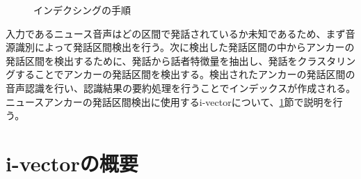 \begin{figure}[H]
\begin{center}
  \end{center}
  \caption{インデクシングの手順 \label{fig:indexing}}
\end{figure}

入力であるニュース音声はどの区間で発話されているか未知であるため、まず音源識別によって発話区間検出を行う。次に検出した発話区間の中からアンカーの発話区間を検出するために、発話から話者特徴量を抽出し、発話をクラスタリングすることでアンカーの発話区間を検出する。検出されたアンカーの発話区間の音声認識を行い、認識結果の要約処理を行うことでインデックスが作成される。ニュースアンカーの発話区間検出に使用するi-vectorについて、\ref{chapter:iv}節で説明を行う。

%

\section{i-vectorの概要}
\label{chapter:iv}


%
